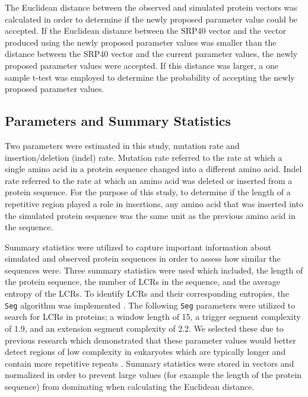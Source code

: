 \documentclass[10pt]{article}
\begin{document}
The Euclidean distance between the observed and simulated protein vectors was calculated in order to determine if the newly proposed parameter value could be accepted. If the Euclidean distance between the SRP40 vector and the vector produced using the newly proposed parameter values was smaller than the distance between the SRP40 vector and the current parameter values, the newly proposed parameter values were accepted. If this distance was larger, a one sample t-test was employed to determine the probability of accepting the newly proposed parameter values.

\subsection{Parameters and Summary Statistics}

Two parameters were estimated in this study, mutation rate and insertion/deletion (indel) rate. Mutation rate referred to the rate at which a single amino acid in a protein sequence changed into a different amino acid. Indel rate referred to the rate at which an amino acid was deleted or inserted from a protein sequence. For the purpose of this study, to determine if the length of a repetitive region played a role in insertions, any amino acid that was inserted into the simulated protein sequence was the same unit as the previous amino acid in the sequence.

Summary statistics were utilized to capture important information about simulated and observed protein sequences in order to assess how similar the sequences were. Three summary statistics were used which included, the length of the protein sequence, the number of LCRs in the sequence, and the average entropy of the LCRs. To identify LCRs and their corresponding entropies, the \texttt{Seg} algorithm was implemented \citep{wootton1993statistics}. The following \texttt{Seg} parameters were utilized to search for LCRs in proteins; a window length of 15, a trigger segment complexity of 1.9, and an extension segment complexity of 2.2. We selected these due to previous research which demonstrated that these parameter values would better detect regions of low complexity in eukaryotes which are typically longer and contain more repetitive repeats \citep{huntley2000evolution}. Summary statistics were stored in vectors and normalized in order to prevent large values (for example the length of the protein sequence) from dominating when calculating the Euclidean distance.
\end{document}
